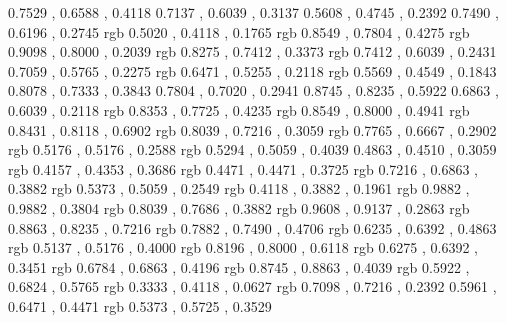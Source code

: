 \definecolor{shirocha}{rgb}	{	0.7529	,	0.6588	,	0.4118	}
\definecolor{odo}{rgb}	        {	0.7137	,	0.6039	,	0.3137	}
\definecolor{ginsusutake}{rgb}	{	0.5608	,	0.4745	,	0.2392	}
\definecolor{kigaracha}{rgb}	{	0.7490	,	0.6196	,	0.2745	}
\definecolor{kobicha}	{rgb}	{	0.5020	,	0.4118	,	0.1765	}
\definecolor{usuki}	{rgb}	{	0.8549	,	0.7804	,	0.4275	}
\definecolor{yamabuki}	{rgb}	{	0.9098	,	0.8000	,	0.2039	}
\definecolor{tamago}	{rgb}	{	0.8275	,	0.7412	,	0.3373	}
\definecolor{hajizome}	{rgb}	{	0.7412	,	0.6039	,	0.2431	}
\definecolor{yamabukicha}{rgb}	{	0.7059	,	0.5765	,	0.2275	}
\definecolor{kuwazome}	{rgb}	{	0.6471	,	0.5255	,	0.2118	}
\definecolor{namakabe}	{rgb}	{	0.5569	,	0.4549	,	0.1843	}
\definecolor{kuchinashi}{rgb}	{	0.8078	,	0.7333	,	0.3843	}
\definecolor{tomorokoshi}{rgb}	{	0.7804	,	0.7020	,	0.2941	}
\definecolor{shirotsurubami}{rgb}	{	0.8745	,	0.8235	,	0.5922	}
\definecolor{kitsurubami}{rgb}	{	0.6863	,	0.6039	,	0.2118	}
\definecolor{toou}	{rgb}	{	0.8353	,	0.7725	,	0.4235	}
\definecolor{hanaba}	{rgb}	{	0.8549	,	0.8000	,	0.4941	}
\definecolor{torinoko}	{rgb}	{	0.8431	,	0.8118	,	0.6902	}
\definecolor{ukon}	{rgb}	{	0.8039	,	0.7216	,	0.3059	}
\definecolor{kikuchiba}	{rgb}	{	0.7765	,	0.6667	,	0.2902	}
\definecolor{rikyucha}	{rgb}	{	0.5176	,	0.5176	,	0.2588	}
\definecolor{aku}	{rgb}	{	0.5294	,	0.5059	,	0.4039	}
\definecolor{higosusutake}{rgb}	{	0.4863	,	0.4510	,	0.3059	}
\definecolor{rokocha}	{rgb}	{	0.4157	,	0.4353	,	0.3686	}
\definecolor{mirucha}	{rgb}	{	0.4471	,	0.4471	,	0.3725	}
\definecolor{natane}	{rgb}	{	0.7216	,	0.6863	,	0.3882	}
\definecolor{kimirucha}	{rgb}	{	0.5373	,	0.5059	,	0.2549	}
\definecolor{uguisucha}	{rgb}	{	0.4118	,	0.3882	,	0.1961	}
\definecolor{nanohana}	{rgb}	{	0.9882	,	0.9882	,	0.3804	}
\definecolor{kariyasu}	{rgb}	{	0.8039	,	0.7686	,	0.3882	}
\definecolor{kihada}	{rgb}	{	0.9608	,	0.9137	,	0.2863	}
\definecolor{zoge}	{rgb}	{	0.8863	,	0.8235	,	0.7216	}
\definecolor{wara}	{rgb}	{	0.7882	,	0.7490	,	0.4706	}
\definecolor{macha}	{rgb}	{	0.6235	,	0.6392	,	0.4863	}
\definecolor{yamabato}	{rgb}	{	0.5137	,	0.5176	,	0.4000	}
\definecolor{mushikuri}	{rgb}	{	0.8196	,	0.8000	,	0.6118	}
\definecolor{aokuchiba}	{rgb}	{	0.6275	,	0.6392	,	0.3451	}
\definecolor{hiwacha}	{rgb}	{	0.6784	,	0.6863	,	0.4196	}
\definecolor{ominaeshi}	{rgb}	{	0.8745	,	0.8863	,	0.4039	}
\definecolor{wasabi}	{rgb}	{	0.5922	,	0.6824	,	0.5765	}
\definecolor{uguisu}	{rgb}	{	0.3333	,	0.4118	,	0.0627	}
\definecolor{hiwa}	{rgb}	{	0.7098	,	0.7216	,	0.2392	}
\definecolor{aoshirotsurubami}{rgb}	{	0.5961	,	0.6471	,	0.4471	}
\definecolor{yanagicha}	{rgb}	{	0.5373	,	0.5725	,	0.3529	}
